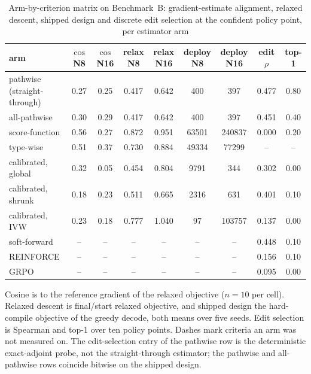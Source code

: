 \begin{table}[t]\centering\caption{Arm-by-criterion matrix on Benchmark~B: gradient-estimate alignment, relaxed descent, shipped design and discrete edit selection at the confident policy point, per estimator arm}
\label{tab:armmatrix}
\footnotesize\setlength{\tabcolsep}{4pt}
\begin{tabular}{l cc cc cc cc}
\toprule
arm & $\cos$ N8 & $\cos$ N16 & relax N8 & relax N16 & deploy N8 & deploy N16 & edit $\rho$ & top-1 \\
\midrule
pathwise (straight-through) & 0.27 & 0.25 & 0.417 & 0.642 & 400 & 397 & 0.477 & 0.80 \\
all-pathwise & 0.30 & 0.29 & 0.417 & 0.642 & 400 & 397 & 0.451 & 0.40 \\
score-function & 0.56 & 0.27 & 0.872 & 0.951 & 63501 & 240837 & 0.000 & 0.20 \\
type-wise & 0.51 & 0.37 & 0.730 & 0.884 & 49334 & 77299 & -- & -- \\
calibrated, global & 0.32 & 0.05 & 0.454 & 0.804 & 9791 & 344 & 0.302 & 0.00 \\
calibrated, shrunk & 0.18 & 0.23 & 0.511 & 0.665 & 2316 & 631 & 0.401 & 0.10 \\
calibrated, IVW & 0.23 & 0.18 & 0.777 & 1.040 & 97 & 103757 & 0.137 & 0.00 \\
soft-forward & -- & -- & -- & -- & -- & -- & 0.448 & 0.10 \\
REINFORCE & -- & -- & -- & -- & -- & -- & 0.156 & 0.10 \\
GRPO & -- & -- & -- & -- & -- & -- & 0.095 & 0.00 \\
\bottomrule
\end{tabular}
\par\medskip
{\footnotesize Cosine is to the reference gradient of the relaxed objective ($n=10$ per cell).  Relaxed descent is final/start relaxed objective, and shipped design the hard-compile objective of the greedy decode, both means over five seeds.  Edit selection is Spearman and top-1 over ten policy points.  Dashes mark criteria an arm was not measured on.  The edit-selection entry of the pathwise row is the deterministic exact-adjoint probe, not the straight-through estimator; the pathwise and all-pathwise rows coincide bitwise on the shipped design.\par}
\end{table}

